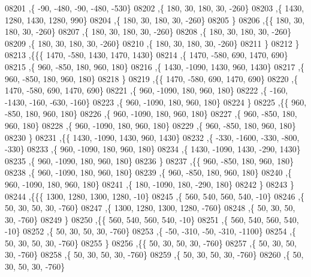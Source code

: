\begin{DoxyCode}
08201     ,\{   -90,  -480,   -90,  -480,  -530\}
08202     ,\{   180,    30,   180,    30,  -260\}
08203     ,\{  1430,  1280,  1430,  1280,   990\}
08204     ,\{   180,    30,   180,    30,  -260\}
08205     \}
08206    ,\{\{   180,    30,   180,    30,  -260\}
08207     ,\{   180,    30,   180,    30,  -260\}
08208     ,\{   180,    30,   180,    30,  -260\}
08209     ,\{   180,    30,   180,    30,  -260\}
08210     ,\{   180,    30,   180,    30,  -260\}
08211     \}
08212    \}
08213   ,\{\{\{  1470,  -580,  1430,  1470,  1430\}
08214     ,\{  1470,  -580,   690,  1470,   690\}
08215     ,\{   960,  -850,   180,   960,   180\}
08216     ,\{  1430, -1090,  1430,   960,  1430\}
08217     ,\{   960,  -850,   180,   960,   180\}
08218     \}
08219    ,\{\{  1470,  -580,   690,  1470,   690\}
08220     ,\{  1470,  -580,   690,  1470,   690\}
08221     ,\{   960, -1090,   180,   960,   180\}
08222     ,\{  -160, -1430,  -160,  -630,  -160\}
08223     ,\{   960, -1090,   180,   960,   180\}
08224     \}
08225    ,\{\{   960,  -850,   180,   960,   180\}
08226     ,\{   960, -1090,   180,   960,   180\}
08227     ,\{   960,  -850,   180,   960,   180\}
08228     ,\{   960, -1090,   180,   960,   180\}
08229     ,\{   960,  -850,   180,   960,   180\}
08230     \}
08231    ,\{\{  1430, -1090,  1430,   960,  1430\}
08232     ,\{  -330, -1600,  -330,  -800,  -330\}
08233     ,\{   960, -1090,   180,   960,   180\}
08234     ,\{  1430, -1090,  1430,  -290,  1430\}
08235     ,\{   960, -1090,   180,   960,   180\}
08236     \}
08237    ,\{\{   960,  -850,   180,   960,   180\}
08238     ,\{   960, -1090,   180,   960,   180\}
08239     ,\{   960,  -850,   180,   960,   180\}
08240     ,\{   960, -1090,   180,   960,   180\}
08241     ,\{   180, -1090,   180,  -290,   180\}
08242     \}
08243    \}
08244   ,\{\{\{  1300,  1280,  1300,  1280,   -10\}
08245     ,\{   560,   540,   560,   540,   -10\}
08246     ,\{    50,    30,    50,    30,  -760\}
08247     ,\{  1300,  1280,  1300,  1280,  -760\}
08248     ,\{    50,    30,    50,    30,  -760\}
08249     \}
08250    ,\{\{   560,   540,   560,   540,   -10\}
08251     ,\{   560,   540,   560,   540,   -10\}
08252     ,\{    50,    30,    50,    30,  -760\}
08253     ,\{   -50,  -310,   -50,  -310, -1100\}
08254     ,\{    50,    30,    50,    30,  -760\}
08255     \}
08256    ,\{\{    50,    30,    50,    30,  -760\}
08257     ,\{    50,    30,    50,    30,  -760\}
08258     ,\{    50,    30,    50,    30,  -760\}
08259     ,\{    50,    30,    50,    30,  -760\}
08260     ,\{    50,    30,    50,    30,  -760\}

\end{DoxyCode}
